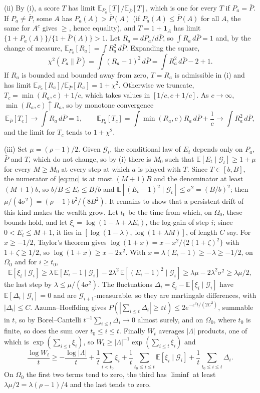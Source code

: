 \documentclass[11pt]{article}
\newcommand{\E}{\mathbb{E}}
\newcommand{\G}{\mathcal{G}}
\theoremstyle{remark}
\begin{document}
(ii) By (i), a score $T$ has limit $\E_{P_a}[T]/\E_{\bar P}[T]$, which is one
for every $T$ if $P_a = \bar P$. If $P_a \ne \bar P$, some $A$ has
$P_a(A) > \bar P(A)$ (if $P_a(A) \le \bar P(A)$ for all $A$, the same for $A^c$
gives $\ge$, hence equality), and $T = 1 + \mathbf 1_A$ has limit
$\{1 + P_a(A)\}/\{1 + \bar P(A)\} > 1$. Let $R_a = dP_a/d\bar P$, so
$\int R_a\, d\bar P = 1$ and, by the change of measure,
$\E_{P_a}[R_a] = \int R_a^2\, d\bar P$. Expanding the square,
\[
\chi^2(P_a\|\bar P) = \int (R_a - 1)^2\, d\bar P = \int R_a^2\, d\bar P - 2 + 1 .
\]
If $R_a$ is bounded and bounded away from zero, $T = R_a$ is admissible in (i)
and has limit $\E_{P_a}[R_a]/\E_{\bar P}[R_a] = 1 + \chi^2$. Otherwise we
truncate, $T_c = \min(R_a, c) + 1/c$, which takes values in $[1/c, c + 1/c]$.
As $c \to \infty$,
$\min(R_a, c) \uparrow R_a$, so by monotone convergence
\[
\E_{\bar P}[T_c] \to \int R_a\, d\bar P = 1,
\qquad
\E_{P_a}[T_c] = \int \min(R_a, c) R_a\, d\bar P + \frac1c \to \int R_a^2\, d\bar P,
\]
and the limit for $T_c$ tends to $1 + \chi^2$.

(iii) Set $\mu = (\rho - 1)/2$. Given $\G_t$, the conditional law of $E_t$
depends only on $P_a$, $\bar P$ and $T$, which do not change, so by (i) there
is $M_0$ such that $\E[E_t \mid \G_t] \ge 1 + \mu$ for every $M \ge M_0$ at
every step at which $a$ is played with $T$. Since $T \in [b, B]$, the
numerator of \eqref{eq:mc} is at most $(M+1)B$ and the denominator at least
$(M+1)b$, so $b/B \le E_t \le B/b$ and
$\E[(E_t - 1)^2 \mid \G_t] \le \sigma^2 = (B/b)^2$; then
$\mu/(4\sigma^2) = (\rho-1)b^2/(8B^2)$. It remains to show that a persistent
drift of this kind makes the wealth grow. Let $t_0$ be the time from which,
on $\Omega_0$, these bounds hold, and let
$\xi_i = \log(1 - \lambda + \lambda E_i)$, the log-gain of step $i$;
since $0 < E_i \le M+1$, it lies in $[\log(1-\lambda), \log(1+\lambda M)]$, of
length $C$ say. For $x \ge -1/2$, Taylor's theorem gives
$\log(1+x) = x - x^2/\{2(1+\zeta)^2\}$ with $1+\zeta \ge 1/2$, so
$\log(1+x) \ge x - 2x^2$. With $x = \lambda(E_i - 1) \ge -\lambda \ge -1/2$, on
$\Omega_0$ and for $i \ge t_0$,
\[
\E[\xi_i \mid \G_i] \ge \lambda\,\E[E_i - 1 \mid \G_i] - 2\lambda^2\,\E[(E_i-1)^2 \mid \G_i]
\ge \lambda\mu - 2\lambda^2\sigma^2 \ge \lambda\mu/2,
\]
the last step by $\lambda \le \mu/(4\sigma^2)$. The fluctuations
$\Delta_i = \xi_i - \E[\xi_i \mid \G_i]$ have $\E[\Delta_i \mid \G_i] = 0$ and are
$\G_{i+1}$-measurable, so they are martingale differences, with
$|\Delta_i| \le C$. Azuma--Hoeffding \citep{azuma1967weighted} gives
$P(|\sum_{i \le t}\Delta_i| \ge \varepsilon t) \le 2e^{-\varepsilon^2 t/(2C^2)}$,
summable in $t$, so by Borel--Cantelli $t^{-1}\sum_{i \le t}\Delta_i \to 0$
almost surely, and on $\Omega_0$, where $t_0$ is finite, so does the sum over
$t_0 \le i \le t$. Finally $W_t$ averages $|\Lambda|$ products, one of which is
$\exp(\sum_{i \le t}\xi_i)$, so $W_t \ge |\Lambda|^{-1}\exp(\sum_{i \le t}\xi_i)$ and
\[
\frac{\log W_t}{t} \ge -\frac{\log|\Lambda|}{t} + \frac1t\sum_{i < t_0} \xi_i
+ \frac1t\sum_{t_0 \le i \le t} \E[\xi_i \mid \G_i] + \frac1t\sum_{t_0 \le i \le t}\Delta_i .
\]
On $\Omega_0$ the first two terms tend to zero, the third has $\liminf$ at
least $\lambda\mu/2 = \lambda(\rho-1)/4$ and the last tends to zero.
\end{document}
